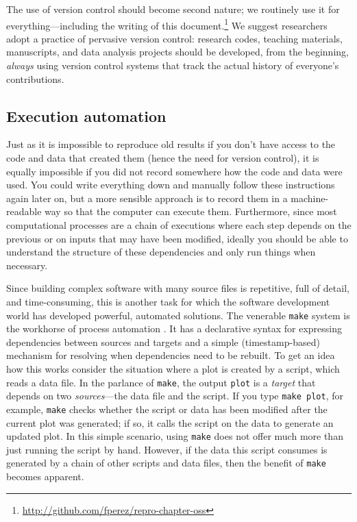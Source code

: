 \documentclass[ChapterTOCs,krantz2]{krantz} %
\begin{document}
The use of version control should become second nature; we
routinely use it for everything---including the writing of this
document.\footnote{\url{http://github.com/fperez/repro-chapter-oss}}  We
suggest researchers adopt a practice of pervasive version control: research
codes, teaching materials, manuscripts, and data analysis projects should be
developed, from the beginning, \emph{always} using version control systems that
track the actual history of everyone's contributions.

\subsection{Execution automation}

Just as it is impossible to reproduce old results if you don't have access to
the code and data that created them (hence the need for version control), it is
equally impossible if you did not record somewhere how the code and data were
used.  You could write everything down and manually follow these instructions
again later on, but a more sensible approach is to record them in a
machine-readable way so that the computer can execute them.  Furthermore, since
most computational processes are a chain of executions where each step depends
on the previous or on inputs that may have been modified, ideally you should be
able to understand the structure of these dependencies and only run things when
necessary.

Since building complex software with many source files is repetitive, full of
detail, and time-consuming, this is another task for which the software
development world has developed powerful, automated solutions.  The venerable
\texttt{make} system is the workhorse of process automation \cite{make:2004}.
It has a declarative syntax for expressing dependencies between sources and
targets and a simple (timestamp-based) mechanism for resolving when
dependencies need to be rebuilt.  To get an idea how this works consider the
situation where a plot is created by a script, which reads a data file. In the
parlance of \texttt{make}, the output \texttt{plot} is a \emph{target} that
depends on two \emph{sources}---the data file and the script. If you type
\texttt{make plot}, for example, \texttt{make} checks whether the script or
data has been modified after the current plot was generated; if so, it calls
the script on the data to generate an updated plot. In this simple scenario,
using \texttt{make} does not offer much more than just running the script by
hand.  However, if the data this script consumes is generated by a chain of
other scripts and data files, then the benefit of \texttt{make} becomes
apparent.
\end{document}
